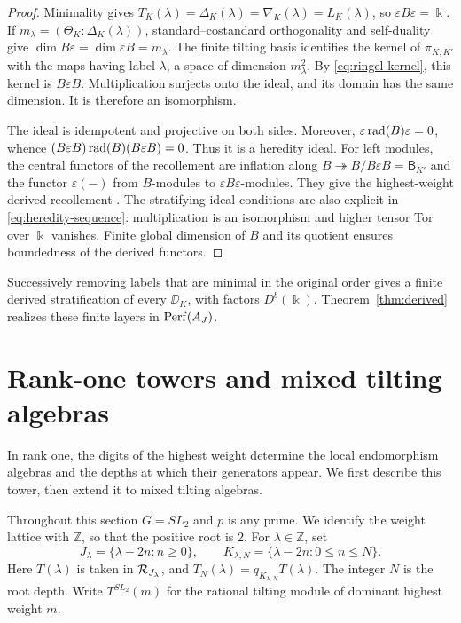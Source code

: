 \documentclass[11pt,reqno]{amsart}
\newcommand{\kk}{\Bbbk}\newcommand{\ZZ}{\mathbb Z}\newcommand{\NN}{\mathbb N}
\theoremstyle{definition}
\theoremstyle{remark}
\numberwithin{equation}{section}
\begin{document}
\begin{proof}
Minimality gives
$T_K(\lambda)=\Delta_K(\lambda)=\nabla_K(\lambda)=L_K(\lambda)$,
so $\varepsilon B\varepsilon=\kk$. If
$m_\lambda=(\Theta_K:\Delta_K(\lambda))$, standard--costandard
orthogonality and self-duality give
$\dim B\varepsilon=\dim\varepsilon B=m_\lambda$.
The finite tilting basis identifies the kernel of $\pi_{K,K'}$ with
the maps having label $\lambda$, a space of dimension $m_\lambda^2$.
By \eqref{eq:ringel-kernel}, this kernel is $B\varepsilon B$.
Multiplication surjects onto the ideal, and its domain has the same
dimension. It is therefore an isomorphism.

The ideal is idempotent and projective on both sides. Moreover,
$\varepsilon\operatorname{rad}(B)\varepsilon=0$, whence
$(B\varepsilon B)\operatorname{rad}(B)(B\varepsilon B)=0$. Thus it is a heredity
ideal. For left modules, the central functors of the recollement are
inflation along $B\twoheadrightarrow B/B\varepsilon B=\mathsf B_{K'}$
and the functor $\varepsilon(-)$ from $B$-modules to
$\varepsilon B\varepsilon$-modules. They give the highest-weight
derived recollement \cite[Theorem~3.4, Remark~3.5(4)]{Krause}.
The stratifying-ideal conditions are also explicit in
\eqref{eq:heredity-sequence}: multiplication is an isomorphism and
higher tensor Tor over $\kk$ vanishes. Finite global dimension of
$B$ and its quotient ensures boundedness of the derived functors.
\end{proof}

Successively removing labels that are minimal in the original order
gives a finite derived stratification of every $\DD_K$, with factors
$D^b(\kk)$. Theorem~\ref{thm:derived} realizes these finite layers
in $\operatorname{Perf}(A_J)$.

\section{Rank-one towers and mixed tilting algebras}
\label{sec:examples}

In rank one, the digits of the highest weight determine the local
endomorphism algebras and the depths at which their generators appear.
We first describe this tower, then extend it to mixed tilting algebras.

Throughout this section $G=SL_2$ and $p$ is any prime. We identify the
weight lattice with $\ZZ$, so that the positive root is $2$. For
$\lambda\in\ZZ$, set
\[
 J_\lambda=\{\lambda-2n:n\geq0\},\qquad
 K_{\lambda,N}=\{\lambda-2n:0\leq n\leq N\}.
\]
Here $T(\lambda)$ is taken in $\mathcal R_{J_\lambda}$, and
$T_N(\lambda)=q_{K_{\lambda,N}}T(\lambda)$. The integer $N$ is
the root depth. Write $T^{SL_2}(m)$ for the rational tilting module
of dominant highest weight $m$.
\end{document}
